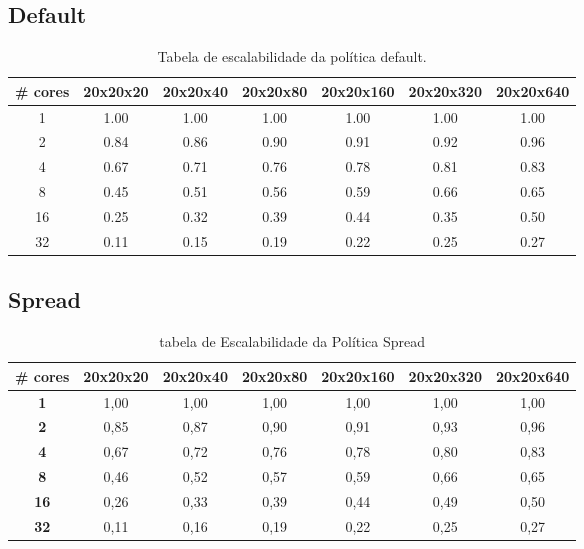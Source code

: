 \documentclass[a4paper, 12pt]{article}
\begin{document}
	\subsection{Default}	
	\begin{table}[h]
		\centering
		\begin{tabular}{|c|c|c|c|c|c|c|}
			\hline
			\textbf{\# cores }& \textbf{20x20x20} & \textbf{20x20x40} & \textbf{20x20x80} & \textbf{20x20x160} & \textbf{20x20x320} & \textbf{20x20x640} \\ \hline
			1        & 1.00     & 1.00     & 1.00     & 1.00      & 1.00      & 1.00      \\ \hline
			2        & 0.84     & 0.86     & 0.90     & 0.91      & 0.92      & 0.96      \\ \hline
			4        & 0.67     & 0.71     & 0.76     & 0.78      & 0.81      & 0.83      \\ \hline
			8        & 0.45     & 0.51     & 0.56     & 0.59      & 0.66      & 0.65      \\ \hline
			16       & 0.25     & 0.32     & 0.39     & 0.44      & 0.35      & 0.50      \\ \hline
			32       & 0.11     & 0.15     & 0.19     & 0.22      & 0.25      & 0.27      \\ \hline
		\end{tabular}
		\caption{Tabela de escalabilidade da política default.}
	\end{table}
	
	\subsection{Spread}
	\begin{table}[htbp]
		\centering
		\begin{tabular}{|c|c|c|c|c|c|c|}
			\hline
			\textbf{\# cores} & \textbf{20x20x20} & \textbf{20x20x40} & \textbf{20x20x80} & \textbf{20x20x160} & \textbf{20x20x320} & \textbf{20x20x640} \\
			\hline
			\textbf{1} & 1,00 & 1,00 & 1,00 & 1,00 & 1,00 & 1,00 \\
			\hline
			\textbf{2} & 0,85 & 0,87 & 0,90 & 0,91 & 0,93 & 0,96 \\
			\hline
			\textbf{4} & 0,67 & 0,72 & 0,76 & 0,78 & 0,80 & 0,83 \\
			\hline
			\textbf{8} & 0,46 & 0,52 & 0,57 & 0,59 & 0,66 & 0,65 \\
			\hline
			\textbf{16} & 0,26 & 0,33 & 0,39 & 0,44 & 0,49 & 0,50 \\
			\hline
			\textbf{32} & 0,11 & 0,16 & 0,19 & 0,22 & 0,25 & 0,27 \\
			\hline
		\end{tabular}
		\caption{tabela de Escalabilidade da Política Spread}
	\end{table}
	
\end{document}
